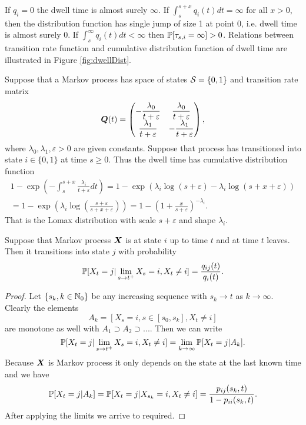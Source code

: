 {If $q_i = 0$ the dwell time is almost surely $\infty$. If $\int_{s}^{s+x} q_i(t) dt = \infty$ for all $x>0$, then the distribution function has single jump of size 1 at point 0, i.e. dwell time is almost surely 0. If $\int_{s}^{\infty} q_i(t) dt < \infty$ then $\pr [ \tau_{s,i} = \infty] > 0$. Relations between transition rate function and cumulative distribution function of dwell time are illustrated in Figure \ref{fig:dwellDist}.

\begin{example}
	Suppose that a Markov process has space of states $\S = \{0,1\}$ and transition rate matrix
	\[
		\m{Q} (t) = 
		\begin{pmatrix}
			-\dfrac{\lambda_{0}}{t+\varepsilon} & \dfrac{\lambda_{0}}{t+\varepsilon} \\
			\dfrac{\lambda_{1}}{t+\varepsilon} & -\dfrac{\lambda_{1}}{t+\varepsilon}
\end{pmatrix},
	\]
	where $\lambda_{0}, \lambda_{1}, \varepsilon > 0$ are given constants. Suppose that process has transitioned into state $i \in \{0,1\}$ at time $s \geq 0$. Thus the dwell time has cumulative distribution function
	\begin{multline*}
		1 - \exp \left(- \int_{s}^{s+x} \frac{\lambda_{i}}{t+\varepsilon} dt \right)
		= 1 - \exp \left(\lambda_{i} \log(s+\varepsilon) - \lambda_{i} \log(s+x+\varepsilon) \right) \\
		= 1 - \exp \left(\lambda_{i} \log \left( \frac{s+\varepsilon}{s+x+\varepsilon} \right) \right)
		= 1 - \left(1 + \frac{x}{s+\varepsilon} \right)^{-\lambda_{i}}.
	\end{multline*}
	That is the Lomax distribution with scale $s+\varepsilon$ and shape $\lambda_i$.
	\demo
\end{example}

\begin{proposition}
	\label{prop:transProb}
	Suppose that Markov process $\m{X}$ is at state $i$ up to time $t$ and at time $t$ leaves. Then it transitions into state $j$ with probability
	\[
		\pr [X_t = j \vert \lim_{s \to t^+} X_s = i, X_t \neq i ] = \frac{q_{ij}(t)}{q_{i}(t)}.
	\]
\end{proposition}

\begin{proof}
	Let $\{s_k, k \in \N_0 \}$ be any increasing sequence with $s_k \to t$ as $k \to \infty$. Clearly the elements
	\[
		A_k = [ X_s = i, s \in [s_0, s_k], X_t \neq i ]
	\]
	are monotone as well with $A_1 \supset A_2 \supset ...$. Then we can write
	\[
		\pr [X_t = j \vert \lim_{s \to t^+} X_s = i, X_t \neq i ] = \lim_{k \to \infty} \pr [X_t = j \vert A_k].
	\]
	Because $\m{X}$ is Markov process it only depends on the state at the last known time and we have
	\[
		\pr [X_t = j \vert A_k] = \pr [X_t = j \vert X_{s_k}= i, X_t \neq i ] = \frac{p_{ij} (s_k, t)}{1-p_{ii} (s_k, t)}.
	\]
	After applying the limits we arrive to required.
\end{proof}

}
